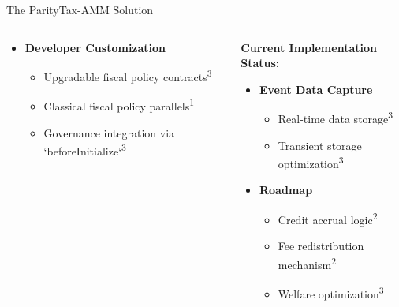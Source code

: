 \documentclass[aspectratio=169]{beamer}
\newcommand{\citeaquilina}{\textcolor{parityblue}{\textsuperscript{1}}}
\newcommand{\citecapponi}{\textcolor{paritygreen}{\textsuperscript{2}}}
\newcommand{\citema}{\textcolor{parityorange}{\textsuperscript{3}}}
\begin{document}
\begin{frame}{The ParityTax-AMM Solution}
\begin{columns}
\begin{column}{0.6\textwidth}
\begin{itemize}
                \item \textcolor{paritygreen}{\textbf{Developer Customization}}
                \begin{itemize}
                    \item Upgradable fiscal policy contracts\citema
                    \item Classical fiscal policy parallels\citeaquilina
                    \item Governance integration via `beforeInitialize`\citema
                \end{itemize}
            \end{itemize}
        \end{column}
        \begin{column}{0.4\textwidth}
            \textbf{Current Implementation Status:}
            \begin{itemize}
                \item \textcolor{paritygreen}{\checkmark} \textbf{Event Data Capture}
                \begin{itemize}
                    \item Real-time data storage\citema
                    \item Transient storage optimization\citema
                \end{itemize}
                
                \item \textcolor{parityblue}{\textbf{Roadmap}}
                \begin{itemize}
                    \item Credit accrual logic\citecapponi
                    \item Fee redistribution mechanism\citecapponi
                    \item Welfare optimization\citema
                \end{itemize}
            \end{itemize}
        \end{column}
    \end{columns}
\end{frame}
\end{document}
